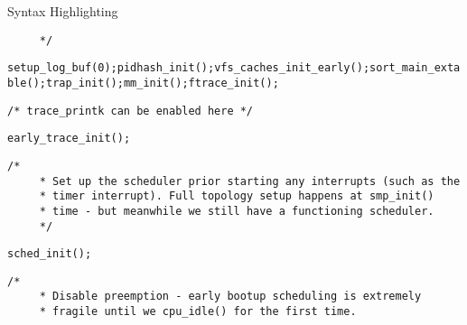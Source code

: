 \begin{frame}{Syntax Highlighting}
\begin{verbatim}
	 */\end{verbatim}\leavevmode\newline\tab\color{Aquamarine}\verb$setup_log_buf$\color{Fuchsia}\verb$($\color{ForestGreen}\verb$0$\color{Fuchsia}\verb$)$\color{Fuchsia}\verb$;$\newline\tab\color{Aquamarine}\verb$pidhash_init$\color{Fuchsia}\verb$($\color{Fuchsia}\verb$)$\color{Fuchsia}\verb$;$\newline\tab\color{Aquamarine}\verb$vfs_caches_init_early$\color{Fuchsia}\verb$($\color{Fuchsia}\verb$)$\color{Fuchsia}\verb$;$\newline\tab\color{Aquamarine}\verb$sort_main_extable$\color{Fuchsia}\verb$($\color{Fuchsia}\verb$)$\color{Fuchsia}\verb$;$\newline\tab\color{Aquamarine}\verb$trap_init$\color{Fuchsia}\verb$($\color{Fuchsia}\verb$)$\color{Fuchsia}\verb$;$\newline\tab\color{Aquamarine}\verb$mm_init$\color{Fuchsia}\verb$($\color{Fuchsia}\verb$)$\color{Fuchsia}\verb$;$\newline\newline\tab\color{Aquamarine}\verb$ftrace_init$\color{Fuchsia}\verb$($\color{Fuchsia}\verb$)$\color{Fuchsia}\verb$;$\newline\newline\tab\color{Rhodamine}\begin{verbatim}/* trace_printk can be enabled here */\end{verbatim}\leavevmode\newline\tab\color{Aquamarine}\verb$early_trace_init$\color{Fuchsia}\verb$($\color{Fuchsia}\verb$)$\color{Fuchsia}\verb$;$\newline\newline\tab\color{Rhodamine}\begin{verbatim}/*
	 * Set up the scheduler prior starting any interrupts (such as the
	 * timer interrupt). Full topology setup happens at smp_init()
	 * time - but meanwhile we still have a functioning scheduler.
	 */\end{verbatim}\leavevmode\newline\tab\color{Aquamarine}\verb$sched_init$\color{Fuchsia}\verb$($\color{Fuchsia}\verb$)$\color{Fuchsia}\verb$;$\newline\tab\color{Rhodamine}\begin{verbatim}/*
	 * Disable preemption - early bootup scheduling is extremely
	 * fragile until we cpu_idle() for the first time.

\end{verbatim}
\end{frame}
